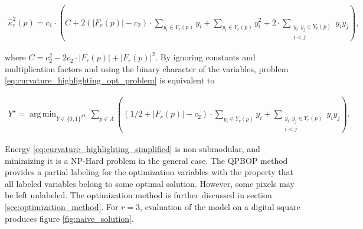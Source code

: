 \documentclass[runningheads]{llncs}
\DeclareMathOperator*{\argmin}{arg\,min}
\begin{document}
	\begin{align*}
		\hat{\kappa}_{r}^2(p) = c_1 \cdot \left( C + 2\left( |F_r(p)| - c_2 \right) \cdot \sum_{y_i \in Y_r(p)}{y_i} + \sum_{y_i \in Y_r(p)}{y_i^2} + 2 \cdot \sum_{ \substack{y_i,y_j \in Y_r(p) \\ i<j} }{y_iy_j}  \right),
	\end{align*}
	
	where $C=c_2^2 - 2c_2 \cdot |F_r(p)| + |F_r(p)|^2$. By ignoring constants and multiplication factors and using the binary character of the variables, problem \eqref{eq:curvature_highlighting_opt_problem} is equivalent to

	
\begin{align}			
	Y^{\star} = \argmin_{Y \in \{0,1\}^{|O|}} \sum_{p \in A}{ \left( { (1/2+ |F_r(p)|-c_2) \cdot \sum_{y_i \in Y_r(p)}{y_i} } + \sum_{ \substack{y_i,y_j \in Y_r(p) \\ i<j} }{y_iy_j} \right) }.
	\label{eq:curvature_highlighting_simplified}
\end{align}

Energy \eqref{eq:curvature_highlighting_simplified} is non-submodular, and minimizing it is a NP-Hard problem in the general case. The QPBOP \cite{rother07} method provides a partial labeling for the optimization variables with the property that all labeled variables belong to some optimal solution. However, some pixels may be left unlabeled. The optimization method is further discussed in section \ref{sec:optimization_method}. For $r=3$, evaluation of the model on a digital square produces figure \ref{fig:naive_solution}.
\end{document}
